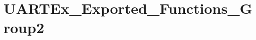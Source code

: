 \hypertarget{group___u_a_r_t_ex___exported___functions___group2}{}\section{U\+A\+R\+T\+Ex\+\_\+\+Exported\+\_\+\+Functions\+\_\+\+Group2}
\label{group___u_a_r_t_ex___exported___functions___group2}

